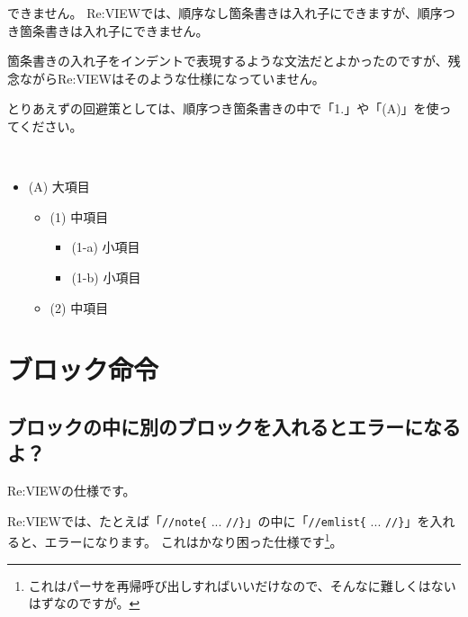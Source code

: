 できません。
Re:VIEWでは、順序なし箇条書きは入れ子にできますが、順序つき箇条書きは入れ子にできません。

箇条書きの入れ子をインデントで表現するような文法だとよかったのですが、残念ながらRe:VIEWはそのような仕様になっていません。

とりあえずの回避策としては、順序つき箇条書きの中で「1.」や「(A)」を使ってください。

\begin{starterprogram}\end{starterprogram}
\noindent
{}\\

\begin{itemize}
\item (A) 大項目

\begin{itemize}
\item (1) 中項目

\begin{itemize}
\item (1{-}a) 小項目
\item (1{-}b) 小項目
\end{itemize}

\item (2) 中項目
\end{itemize}

\end{itemize}

\vspace*{\baselineskip}

\section{ブロック命令}
\label{sec:2-3}
\label{sec-faq-block}

\subsection{ブロックの中に別のブロックを入れるとエラーになるよ？}
\label{sec:2-3-1}
\label{subsec-faq-block1}

Re:VIEWの仕様です。

Re:VIEWでは、たとえば「\texttt{//note\{} ... \texttt{//\}}」の中に「\texttt{//emlist\{} ... \texttt{//\}}」を入れると、エラーになります。
これはかなり困った仕様です\footnote{これはパーサを再帰呼び出しすればいいだけなので、そんなに難しくはないはずなのですが。}。

